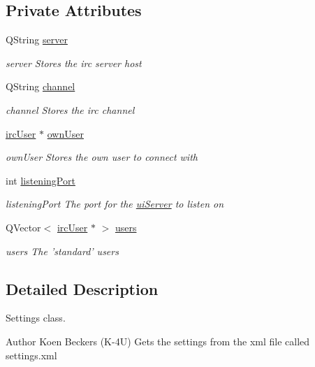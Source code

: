 \subsection*{Private Attributes}
\begin{DoxyCompactItemize}
\item 
Q\-String \hyperlink{classserver_1_1cls_settings_a154a999eefd3fca39cf4d867f2d7ecaa}{server}
\begin{DoxyCompactList}\small\item\em server Stores the irc server host \end{DoxyCompactList}\item 
Q\-String \hyperlink{classserver_1_1cls_settings_a13a2164fcd81177958521ec4171aa07c}{channel}
\begin{DoxyCompactList}\small\item\em channel Stores the irc channel \end{DoxyCompactList}\item 
\hyperlink{classserver_1_1irc_user}{irc\-User} $\ast$ \hyperlink{classserver_1_1cls_settings_af1cf9d75815351217ad046c926a23669}{own\-User}
\begin{DoxyCompactList}\small\item\em own\-User Stores the own user to connect with \end{DoxyCompactList}\item 
int \hyperlink{classserver_1_1cls_settings_a54004af066c09dc076417852f280cfa5}{listening\-Port}
\begin{DoxyCompactList}\small\item\em listening\-Port The port for the \hyperlink{classserver_1_1ui_server}{ui\-Server} to listen on \end{DoxyCompactList}\item 
Q\-Vector$<$ \hyperlink{classserver_1_1irc_user}{irc\-User} $\ast$ $>$ \hyperlink{classserver_1_1cls_settings_a089480b066c0a095426261cd3219506d}{users}
\begin{DoxyCompactList}\small\item\em users The 'standard' users \end{DoxyCompactList}\end{DoxyCompactItemize}


\subsection{Detailed Description}
Settings class. 

\begin{DoxyAuthor}{Author}
Koen Beckers (K-\/4\-U) Gets the settings from the xml file called settings.\-xml 
\end{DoxyAuthor}


